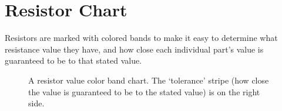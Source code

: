 



\clearpage
\newpage


\clearpage
\newpage


\clearpage
\newpage


\clearpage
\newpage


\clearpage
\newpage

\section{Resistor Chart}

Resistors are marked with colored bands to make it easy to determine what 
resistance value they have, and how close each individual part's value is 
guaranteed to be to that stated value.


\begin{figure}[!ht]
\begin{center}
\caption{A resistor value color band chart. The `tolerance' stripe (how close the value is guaranteed to be to the stated value) is on the right side. }
\label{fig:resistorchart}
\end{center}
\end{figure}
